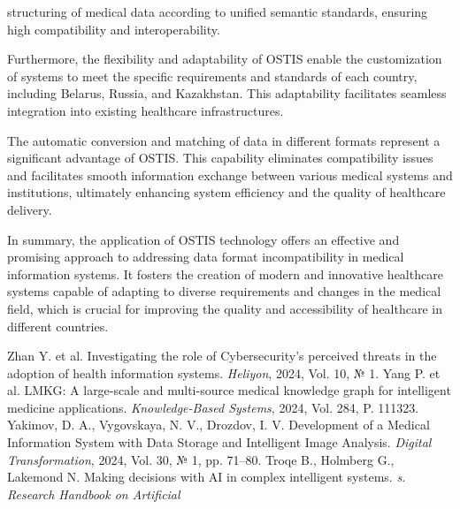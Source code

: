 \documentclass[10pt, a4paper]{article}
\begin{document}
\fontsize{10}{14}\selectfont
\begin{multicols}{2}
\setlength{\parindent}{0.8cm}
\par
\setlength{\parindent}{0.3cm}
\fontsize{10}{15}\selectfont

\noindent structuring of medical data according to unified semantic
standards, ensuring high compatibility and interoperability.
\par
Furthermore, the flexibility and adaptability of OSTIS
enable the customization of systems to meet the specific
requirements and standards of each country, including
Belarus, Russia, and Kazakhstan. This adaptability
facilitates seamless integration into existing healthcare
infrastructures.
\par
The automatic conversion and matching of data in
different formats represent a significant advantage of OSTIS.
This capability eliminates compatibility issues and
facilitates smooth information exchange between various
medical systems and institutions, ultimately enhancing
system efficiency and the quality of healthcare delivery.
\par
In summary, the application of OSTIS technology
offers an effective and promising approach to addressing
data format incompatibility in medical information
systems. It fosters the creation of modern and innovative
healthcare systems capable of adapting to diverse requirements
and changes in the medical field, which is crucial
for improving the quality and accessibility of healthcare
in different countries.
\par
\setlength{\parindent}{0.0cm}
\par
\setlength{\parindent}{0.0cm}
\fontsize{7}{7}\selectfont
    \begin{thebibliography}{15}
        \bibitem[1]{} Zhan Y. et al. Investigating the role of Cybersecurity’s perceived
        threats in the adoption of health information systems. \textit{Heliyon},
        2024, Vol. 10, № 1.
        \bibitem[2]{} Yang P. et al. LMKG: A large-scale and multi-source medical knowledge graph for intelligent medicine applications. \textit{Knowledge-Based Systems}, 2024, Vol. 284, P. 111323.
        \bibitem[3]{} Yakimov, D. A., Vygovskaya, N. V., Drozdov, I. V. Development
        of a Medical Information System with Data Storage and Intelligent Image Analysis. \textit{Digital Transformation}, 2024, Vol. 30, № 1,
        pp. 71–80.
        \bibitem[4]{} Troqe B., Holmberg G., Lakemond N. Making decisions with AI in complex intelligent systems. \textit{s. Research Handbook on Artificial
}
\end{thebibliography}
\end{multicols}
\end{document}
